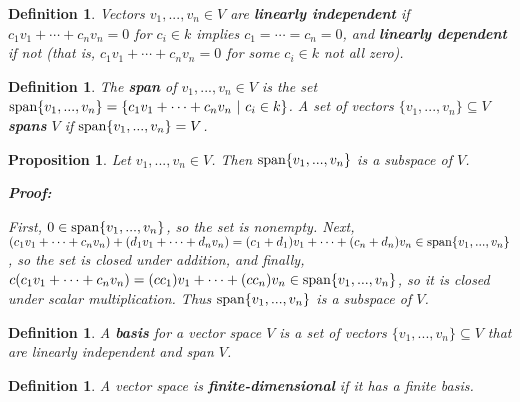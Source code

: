 \documentclass{article}
\theoremstyle{colontheorem}
\newtheorem{proposition}[theorem]{Proposition}
\newtheorem{definition}[theorem]{Definition}
\newcommand{\Span}{\textnormal{span}}
\newenvironment{Proposition}
{
	\begin{mdframed}[backgroundcolor=PropPink!10]
	\begin{proposition}
}
{
	\end{proposition}
	\end{mdframed}
	
	\vspace{.15in}
}
\newenvironment{Def}
{
	\begin{mdframed}[backgroundcolor=DefGreen!10]
	\begin{definition}
}
{
	\end{definition}
	\end{mdframed}
	
	\vspace{.15in}
}
\newenvironment{Proof}
{
	\begin{mdframed}[backgroundcolor=ProofPurple!10]
	\textbf{Proof:}%
}
{
	\end{mdframed}
	
	\vspace{.085in}
}
\begin{document}
\begin{Def}
	
	Vectors $v_1, ..., v_n \in V$ are \textbf{linearly independent} if $c_1 v_1 + \cdots + c_n v_n = 0$ for $c_i \in k$ implies $c_1 = \cdots = c_n = 0$, and \textbf{linearly dependent} if not (that is, $c_1 v_1 + \cdots + c_n v_n = 0$ for some $c_i \in k$ not all zero).
	
\end{Def}



\begin{Def}
	
	The \textbf{span} of $v_1, ..., v_n \in V$ is the set $\Span \{v_1, ..., v_n\} = \{c_1 v_1 + \cdots + c_n v_n\ |\ c_i \in k\}$. A set of vectors $\{v_1, ..., v_n\} \subseteq V$ \textbf{spans} $V$ if $\Span \{v_1, ..., v_n\} = V$.
	
\end{Def}



\begin{Proposition}
	
	Let $v_1, ..., v_n \in V$. Then $\Span \{v_1, ..., v_n\}$ is a subspace of $V$.
	
	\begin{Proof}
		First, $0 \in \Span \{v_1, ..., v_n\}$, so the set is nonempty. Next, $(c_1 v_1 + \cdots + c_n v_n) + (d_1 v_1 + \cdots + d_n v_n) = (c_1 + d_1) v_1 + \cdots + (c_n + d_n) v_n \in \Span \{v_1, ..., v_n\}$, so the set is closed under addition, and finally, $c(c_1 v_1 + \cdots + c_n v_n) = (c c_1) v_1 + \cdots + (c c_n) v_n \in \Span \{v_1, ..., v_n\}$, so it is closed under scalar multiplication. Thus $\Span \{v_1, ..., v_n\}$ is a subspace of $V$.
		
	\end{Proof}
	
\end{Proposition}



\begin{Def}
	
	A \textbf{basis} for a vector space $V$ is a set of vectors $\{v_1, ..., v_n\} \subseteq V$ that are linearly independent and span $V$.
	
\end{Def}



\begin{Def}
	
	A vector space is \textbf{finite-dimensional} if it has a finite basis.
	
\end{Def}
\end{document}
